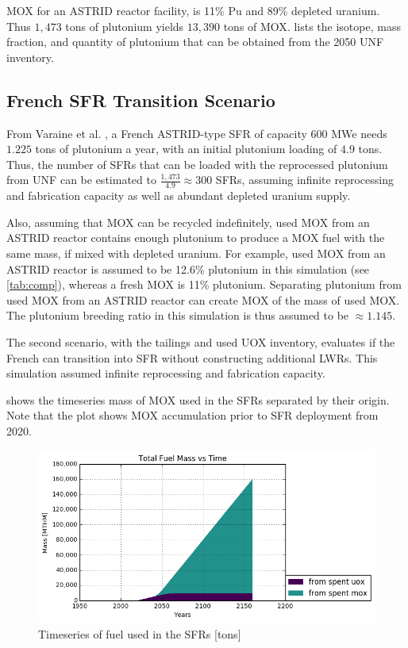 \gls{MOX} for an ASTRID reactor facility, is 11\% Pu and 89\% depleted uranium.
Thus $1,473$ tons of plutonium yields $13,390$ tons of
\gls{MOX}.  lists the isotope, mass fraction,
and quantity of plutonium that can be obtained from the 2050 \gls{UNF} inventory.


\subsection{French \gls{SFR} Transition Scenario}

From Varaine et al. \cite{marsaultmarie-sophie_pre-conceptual_2012}, a French
ASTRID-type \gls{SFR} of capacity 600 MWe needs $1.225$ tons of
plutonium a year, with an initial plutonium loading of $4.9$ tons. 
Thus, the number of \glspl{SFR} that can be loaded with the reprocessed
plutonium from \gls{UNF} can be estimated to $\frac{1,473}{4.9} \approx 300$ \glspl{SFR},
assuming infinite reprocessing and fabrication capacity as well as
abundant depleted uranium supply. 

Also, assuming that \gls{MOX} can be recycled indefinitely,
used \gls{MOX} from an ASTRID reactor
contains enough plutonium to produce a \gls{MOX} fuel with
the same mass, if mixed with depleted uranium. For example,
used \gls{MOX} from an ASTRID reactor is assumed to be 12.6\% plutonium
in this simulation (see \cref{tab:comp}), whereas a fresh \gls{MOX} is 11\% plutonium.
Separating plutonium from used \gls{MOX} from
an ASTRID reactor can create \gls{MOX} of the mass of used \gls{MOX}.
The plutonium breeding ratio in this simulation is thus assumed to be
$\approx 1.145$.

The second scenario, with the tailings and used \gls{UOX}
inventory, evaluates if the French can transition into \gls{SFR}
without constructing additional \gls{LWR}s. This simulation
assumed infinite reprocessing and fabrication capacity.

 shows the timeseries mass of \gls{MOX} used in the 
\gls{SFR}s separated by their origin.
Note that the plot shows \gls{MOX}
accumulation prior to \gls{SFR} deployment from 2020.

\begin{figure}[htbp!]
	\begin{center}
		\includegraphics[scale=0.7]{./images/french-transition/where_fuel.png}
	\end{center}
	\caption{Timeseries of fuel used in the \gls{SFR}s [tons]}
	\label{fig:fuel}
\end{figure}

